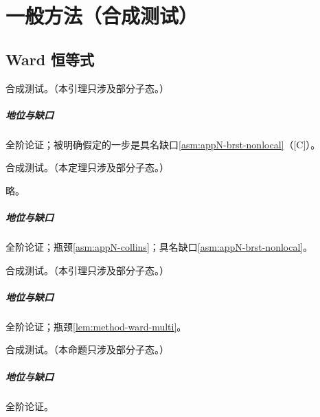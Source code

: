 \chapter{一般方法（合成测试）}\label{ch:method}

\section{Ward 恒等式}\label{sec:method-ward}

\begin{lemma}\label{lem:method-ward-multi}
合成测试。（本引理只涉及部分子态。）
\end{lemma}

\paragraph{地位与缺口}全阶论证；被明确假定的一步是具名缺口\cref{asm:appN-brst-nonlocal}（[C]）。

\begin{theorem}\label{thm:method-template}
合成测试。（本定理只涉及部分子态。）
\end{theorem}
\begin{proofsketch}略。\end{proofsketch}

\paragraph{地位与缺口}全阶论证；瓶颈\cref{asm:appN-collins}；具名缺口\cref{asm:appN-brst-nonlocal}。

\begin{lemma}\label{lem:method-relay}
合成测试。（本引理只涉及部分子态。）
\end{lemma}

\paragraph{地位与缺口}全阶论证；瓶颈\cref{lem:method-ward-multi}。

\begin{proposition}\label{prop:method-gapless}
合成测试。（本命题只涉及部分子态。）
\end{proposition}

\paragraph{地位与缺口}全阶论证。
